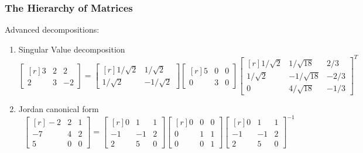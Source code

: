 \documentclass[10pt]{beamer}
\begin{document}
\begin{frame}
\frametitle{The Hierarchy of Matrices}
Advanced decompositions:
\begin{enumerate}[label=\bullet]
\item
Singular Value decomposition
{\footnotesize
\[
\begin{bmatrix*}[r]
3&2&2\\
2&3&-2
\end{bmatrix*} = \begin{bmatrix*}[r]
1/\sqrt 2&1/\sqrt 2\\
1/\sqrt 2 & -1/\sqrt 2
\end{bmatrix*} \begin{bmatrix*}[r]
5&0&0\\
0&3&0
\end{bmatrix*}\begin{bmatrix*}[r]
1/\sqrt 2 & 1/\sqrt{18}&2/3\\
1/\sqrt 2 & -1/\sqrt{18} &-2/3\\
0&4/\sqrt{18}&-1/3
\end{bmatrix*}^T
\]
}
\item
Jordan canonical form
\[
\begin{bmatrix*}[r]
-2&2&1\\
-7&4&2\\
5&0&0
\end{bmatrix*} = \begin{bmatrix*}[r]
0&1&1\\
-1&-1&2\\
2&5&0
\end{bmatrix*}
\begin{bmatrix*}[r]
0&0&0\\
0&1&1\\
0&0&1
\end{bmatrix*}
\begin{bmatrix*}[r]
0&1&1\\
-1&-1&2\\
2&5&0
\end{bmatrix*}^{-1}
\]
\end{enumerate}
\end{frame}
\end{document}
